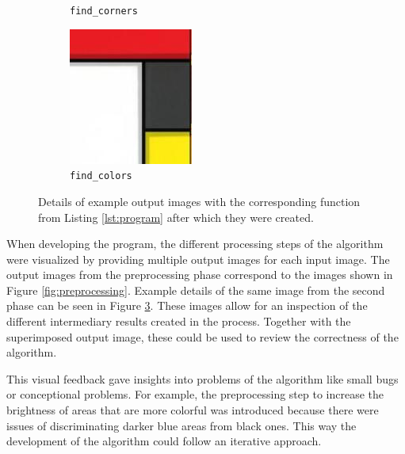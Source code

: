 \documentclass[serif,article,noparskip]{agse-thesis}
\begin{document}
\begin{figure}[b]
\begin{subfigure}{.23\textwidth}
  \caption{\texttt{find\_corners}}
  \label{fig:detect3}
\end{subfigure}
\begin{subfigure}{.23\textwidth}
  \centering
  \includegraphics[width=\linewidth]{images/detect-4.jpg}
  \caption{\texttt{find\_colors}}
  \label{fig:detect4}
\end{subfigure}
\caption{Details of example output images with the corresponding function from Listing \ref{lst:program} after which they were created.}
\label{fig:detect}
\end{figure}

When developing the program, the different processing steps of the algorithm
were visualized by providing multiple output images for each input image. The
output images from the preprocessing phase correspond to the images shown in
Figure \ref{fig:preprocessing}. Example details of the same image from the
second phase can be seen in Figure \ref{fig:detect}. These images allow for an
inspection of the different intermediary results created in the process.
Together with the superimposed output image, these could be used to review the
correctness of the algorithm.

This visual feedback gave insights into problems of the algorithm like small
bugs or conceptional problems. For example, the preprocessing step to increase
the brightness of areas that are more colorful was introduced because there were
issues of discriminating darker blue areas from black ones. This way the
development of the algorithm could follow an iterative approach.
\end{document}
